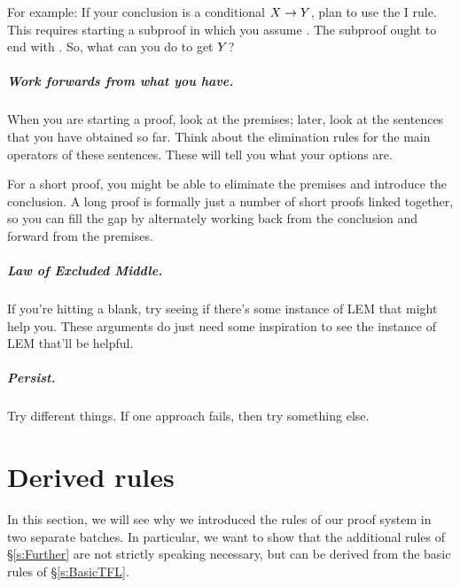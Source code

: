 For example: If your conclusion is a conditional $X\rightarrow Y$, plan to use the {\eif}I rule. This requires starting a subproof in which you assume \metaX. The subproof ought to end with \metaY. So, what can you do to get $Y$?

\paragraph{Work forwards from what you have.}
When you are starting a proof, look at the premises; later, look at the sentences that you have obtained so far. Think about the elimination rules for the main operators of these sentences. These will tell you what your options are.

For a short proof, you might be able to eliminate the premises and introduce the conclusion. A long proof is formally just a number of short proofs linked together, so you can fill the gap by alternately working back from the conclusion and forward from the premises.


\paragraph{Law of Excluded Middle.}
If you're hitting a blank, try seeing if there's some instance of LEM that might help you. These arguments do just need some inspiration to see the instance of LEM that'll be helpful. 

\paragraph{Persist.}
Try different things. If one approach fails, then try something else.


\chapter{Derived rules}\label{s:Derived}

In this section, we will see why we introduced the rules of our proof system in two separate batches. In particular, we want to show that the additional rules of \S\ref{s:Further} are not strictly speaking necessary, but can be derived from the basic rules of \S\ref{s:BasicTFL}.

